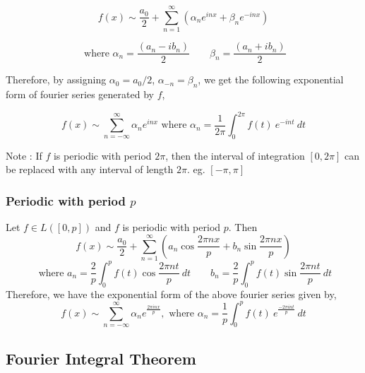 	\[ f(x) \sim \frac{a_0}{2} + \sum_{n=1}^\infty \left( \alpha_n e^{inx} + \beta_n e^{-inx} \right) \]

	\[ \text{ where } \alpha_n = \frac{(a_n - ib_n)}{2} \qquad \beta_n = \frac{(a_n+ib_n)}{2} \]

	Therefore, by assigning \(\alpha_0 = a_0/2\), \(\alpha_{-n} = \beta_n\), we get the following exponential form of fourier series generated by $f$,

	\[ f(x) \sim \sum_{n = -\infty}^\infty \alpha_n e^{inx} \text{ where } \alpha_n = \frac{1}{2\pi} \int_0^{2\pi} f(t)\ e^{-int}\ dt \]

	Note : If $f$ is periodic with period $2\pi$, then the interval of integration $[0,2\pi]$ can be replaced with any interval of length $2\pi$.
	eg. $[-\pi,\pi]$

\subsubsection{Periodic with period $p$}
	Let \(f \in L([0,p])\) and $f$ is periodic with period $p$.
	Then
	\[ f(x) \sim \frac{a_0}{2} + \sum_{n=1}^\infty \left( a_n \cos \frac{2\pi nx}{p} + b_n \sin \frac{2\pi nx}{p} \right) \]
	\[ \text{ where } a_n = \frac{2}{p} \int_0^p f(t) \cos \frac{2\pi nt}{p}\ dt \qquad b_n = \frac{2}{p} \int_0^p f(t) \sin \frac{2\pi nt}{p}\ dt \]
	Therefore, we have the exponential form of the above fourier series given by,
	\[ f(x) \sim \sum_{n = -\infty}^\infty \alpha_n e^\frac{2\pi inx}{p},\text{ where } \alpha_n = \frac{1}{p} \int_0^p f(t)\ e^\frac{-2\pi int}{p}\ dt \]
	
\subsection{Fourier Integral Theorem}

